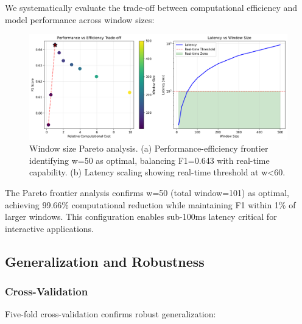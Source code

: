 \documentclass[sigconf,review,anonymous]{acmart}
\begin{document}
We systematically evaluate the trade-off between computational efficiency and model performance across window sizes:

\begin{figure}[h]
\centering
\includegraphics[width=\columnwidth]{figures/window_size_analysis.png}
\caption{Window size Pareto analysis. (a) Performance-efficiency frontier identifying w=50 as optimal, balancing F1=0.643 with real-time capability. (b) Latency scaling showing real-time threshold at w<60.}
\label{fig:window_analysis}
\end{figure}

The Pareto frontier analysis confirms w=50 (total window=101) as optimal, achieving 99.66\% computational reduction while maintaining F1 within 1\% of larger windows. This configuration enables sub-100ms latency critical for interactive applications.

\subsection{Generalization and Robustness}

\subsubsection{Cross-Validation}

Five-fold cross-validation confirms robust generalization:
\end{document}
